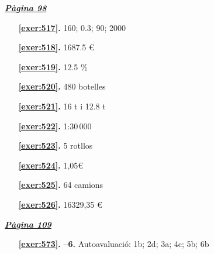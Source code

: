 \hyperlink{page.98}{\textbf{\em Pàgina 98}}
\begin{enumerate}
\item[\fontfamily{phv}\selectfont\color{blue}\textbf{\ref{exer:517}. }] \label{ans:517} 
160; 0.3; 90; 2000
 \end{enumerate}
\begin{enumerate}
\item[\fontfamily{phv}\selectfont\color{blue}\textbf{\ref{exer:518}. }] \label{ans:518} 
1687.5 \euro {}
\item[\fontfamily{phv}\selectfont\color{blue}\textbf{\ref{exer:519}. }] \label{ans:519} 
12.5 \%
\item[\fontfamily{phv}\selectfont\color{blue}\textbf{\ref{exer:520}. }] \label{ans:520} 
480 botelles
\item[\fontfamily{phv}\selectfont\color{blue}\textbf{\ref{exer:521}. }] \label{ans:521} 
16 t i 12.8 t
\item[\fontfamily{phv}\selectfont\color{blue}\textbf{\ref{exer:522}. }] \label{ans:522} 
1:30\,000
\item[\fontfamily{phv}\selectfont\color{blue}\textbf{\ref{exer:523}. }] \label{ans:523} 
5 rotllos
\item[\fontfamily{phv}\selectfont\color{blue}\textbf{\ref{exer:524}. }] \label{ans:524} 
1,05\euro {}
\item[\fontfamily{phv}\selectfont\color{blue}\textbf{\ref{exer:525}. }] \label{ans:525} 
64 camions
\item[\fontfamily{phv}\selectfont\color{blue}\textbf{\ref{exer:526}. }] \label{ans:526} 
16329,35 \euro {}
 \end{enumerate}

 \vspace{1cm} 
 

\vspace{0.3cm}


\hyperlink{page.109}{\textbf{\em Pàgina 109}}
\begin{enumerate}
\item[\fontfamily{phv}\selectfont\color{blue}\textbf{\ref{exer:573}. }] \label{ans:573} 
\textbf {--6.} Autoavaluació: 1b; 2d; 3a; 4c; 5b; 6b
 \end{enumerate}

